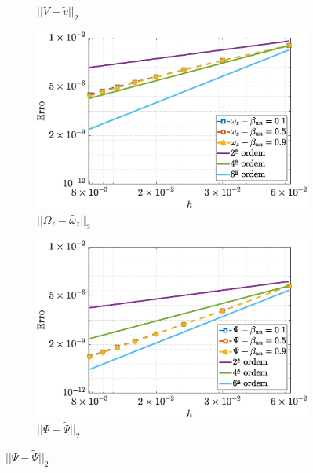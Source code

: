 \begin{figure}[H]
\begin{subfigure}[b]{.47\textwidth}
            \caption{$||V - \widetilde{v}||_{2}$}
            \label{error_v_2nd_Case1_oldorydb}
        \end{subfigure}
        \qquad
        \begin{subfigure}[b]{.47\textwidth}
            \includegraphics[width=\textwidth]{figures/Case12/OldroydB/Errors/NormErr_2nd_Re_100_Wi_1_epsilon_0_xi_0_alphaG_0_Dt_1e-06_at_0.05_tipsim_1_MMS_12_Wz.eps}
            \caption{$||\Omega_{z} - \widetilde{\omega_{z}}||_{2}$}
            \label{error_wz_2nd_Case1_oldorydb}
        \end{subfigure}
        \vspace{0.02cm}
        \qquad
        \begin{subfigure}[b]{.47\textwidth}
            \includegraphics[width=\textwidth]{figures/Case12/OldroydB/Errors/NormErr_2nd_Re_100_Wi_1_epsilon_0_xi_0_alphaG_0_Dt_1e-06_at_0.05_tipsim_1_MMS_12_Psi.eps}
            \caption{$||\Psi - \widetilde{\Psi}||_{2}$}
            \label{error_psi_2nd_Case1_oldorydb}
        \end{subfigure}
        \fdadospesquisa
\end{figure}

